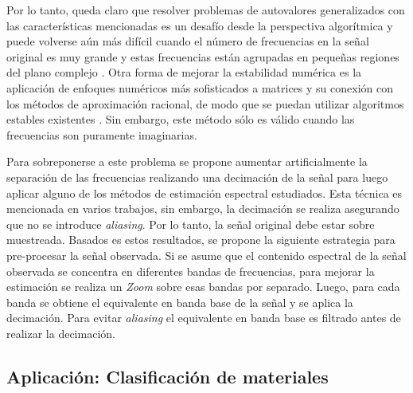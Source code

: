 Por lo tanto, queda claro que resolver problemas de autovalores generalizados con las características mencionadas es un desafío desde la perspectiva algorítmica y puede volverse aún más difícil cuando el número de frecuencias en la señal original es muy grande y estas frecuencias están agrupadas en pequeñas regiones del plano complejo \cite{Cuyt2018, BATENKOV2018, Li1997}. Otra forma de mejorar la estabilidad numérica es la aplicación de enfoques numéricos más sofisticados a matrices y su conexión con los métodos de aproximación racional, de modo que se puedan utilizar algoritmos estables existentes \cite{Derevianko2022}. Sin embargo, este método sólo es válido cuando las frecuencias son puramente imaginarias.

Para sobreponerse a este problema se propone aumentar artificialmente la separación de las frecuencias realizando una decimación de la señal para luego aplicar alguno de los métodos de estimación espectral estudiados. Esta técnica es mencionada en varios trabajos, sin embargo, la decimación se realiza asegurando que no se introduce \emph{aliasing}. Por lo tanto, la señal original debe estar sobre muestreada. Basados es estos resultados, se propone la siguiente estrategia para pre-procesar la señal observada. Si se asume que el contenido espectral de la señal observada se concentra en diferentes bandas de frecuencias, para mejorar la estimación se realiza un \emph{Zoom} sobre esas bandas por separado. Luego, para cada banda se obtiene el equivalente en banda base de la señal y se aplica la decimación. Para evitar \emph{aliasing} el equivalente en banda base es filtrado antes de realizar la decimación. 


\subsection{Aplicación: Clasificación de materiales}

